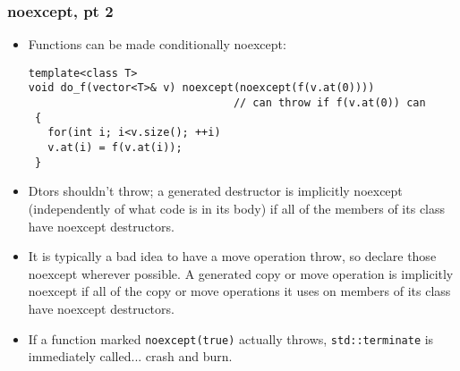 \begin{frame}[fragile,t]
\frametitle{noexcept, pt 2}
\begin{itemize}[<+->]

\item Functions can be made conditionally noexcept:
{\scriptsize\begin{verbatim}
template<class T>
void do_f(vector<T>& v) noexcept(noexcept(f(v.at(0))))
                                // can throw if f(v.at(0)) can
 {
   for(int i; i<v.size(); ++i)
   v.at(i) = f(v.at(i));
 }
\end{verbatim}
}

\item Dtors shouldn't throw; a generated destructor is implicitly
  noexcept (independently of what code is in its body) if all of the
  members of its class have noexcept destructors.

\item It is typically a bad idea to have a move operation throw, so
  declare those noexcept wherever possible. A generated copy or move
  operation is implicitly noexcept if all of the copy or move
  operations it uses on members of its class have noexcept
  destructors.

\item If a function marked \texttt{noexcept(true)} actually throws,
  \texttt{std::terminate} is immediately called... crash and burn.

\end{itemize}
\end{frame}

